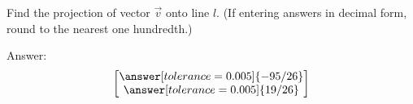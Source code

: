 \documentclass{ximera}
\begin{document}
\begin{problem}\label{prob:proj2}
Find the projection of vector $\vec{v}$ onto line $l$. (If entering answers in decimal form, round to the nearest one hundredth.)

\begin{center}
\end{center}

Answer:
$$\begin{bmatrix}\answer[tolerance=0.005]{-95/26}\\\answer[tolerance=0.005]{19/26}\end{bmatrix}$$
\end{problem}
\end{document}
